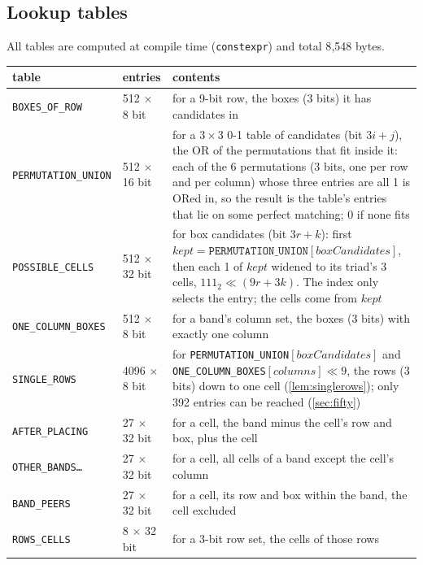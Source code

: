 \documentclass[11pt]{article}
\theoremstyle{definition}
\theoremstyle{plain}
\begin{document}
\subsection{Lookup tables}

All tables are computed at compile time (\texttt{constexpr}) and total 8{,}548 bytes.

\begin{center}
\small
\begin{tabular}{ll>{\raggedright\arraybackslash}p{8.2cm}}
\toprule
table & entries & contents \\
\midrule
\texttt{BOXES\_OF\_ROW} & 512 $\times$ 8 bit & for a 9-bit row, the boxes (3 bits) it has candidates in \\
\texttt{PERMUTATION\_UNION} & 512 $\times$ 16 bit & for a $3\times 3$ 0-1 table of candidates (bit $3i+j$), the OR of the
  permutations that fit inside it: each of the 6 permutations (3 bits, one per row and per column) whose three entries
  are all 1 is ORed in, so the result is the table's entries that lie on some perfect matching; 0 if none fits \\
\texttt{POSSIBLE\_CELLS} & 512 $\times$ 32 bit & for box candidates (bit $3r+k$): first
  $\mathit{kept}=\texttt{PERMUTATION\_UNION}[\mathit{boxCandidates}]$, then each 1 of $\mathit{kept}$ widened to its triad's
  3 cells, $111_2 \ll (9r+3k)$. The index only selects the entry; the cells come from $\mathit{kept}$ \\
\texttt{ONE\_COLUMN\_BOXES} & 512 $\times$ 8 bit & for a band's column set, the boxes (3 bits) with exactly one column \\
\texttt{SINGLE\_ROWS} & 4096 $\times$ 8 bit & for \texttt{PERMUTATION\_UNION}$[\mathit{boxCandidates}]$ and
  \texttt{ONE\_COLUMN\_BOXES}$[\mathit{columns}]\ll 9$, the rows
  (3 bits) down to one cell (\cref{lem:singlerows}); only 392 entries can be reached (\cref{sec:fifty}) \\
\texttt{AFTER\_PLACING} & 27 $\times$ 32 bit & for a cell, the band minus the cell's row and box, plus the cell \\
\texttt{OTHER\_BANDS\ldots} & 27 $\times$ 32 bit & for a cell, all cells of a band except the cell's column \\
\texttt{BAND\_PEERS} & 27 $\times$ 32 bit & for a cell, its row and box within the band, the cell excluded \\
\texttt{ROWS\_CELLS} & 8 $\times$ 32 bit & for a 3-bit row set, the cells of those rows \\
\bottomrule
\end{tabular}
\end{center}
\end{document}
